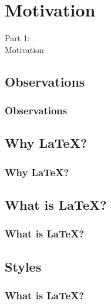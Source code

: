 {
\renewcommand{\bgcolor}{motivation}

\section{Motivation}
\begin{frame}
  \vspace{25mm}
  \begin{center}
    \Huge{Part 1:\\Motivation}
  \end{center}
\end{frame}

\subsection{Observations}
\begin{frame}[fragile]
  \frametitle{Observations}
  \vspace{3mm}
  
\end{frame}

\subsection{Why \LaTeX?}
\begin{frame}[fragile]
  \frametitle{Why \LaTeX?}
  \vspace{3mm}
  
\end{frame}

\subsection{What is \LaTeX?}
\begin{frame}[fragile]
  \frametitle{What is \LaTeX?}
  \vspace{3mm}
  
\end{frame}

\subsection{Styles}
\begin{frame}[fragile]
  \frametitle{What is \LaTeX? }
  \vspace{3mm}
  
\end{frame}

}
